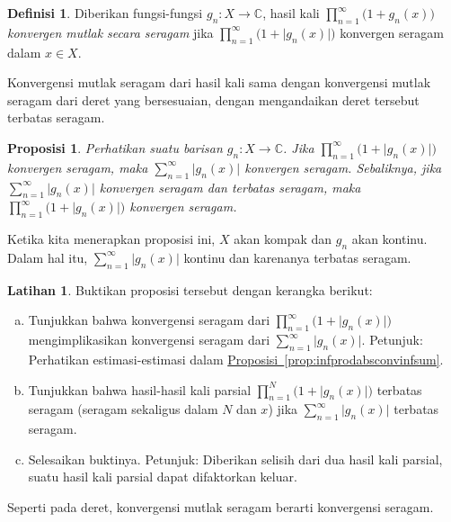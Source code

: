 \documentclass[12pt,openany]{book}
\newcommand{\sabs}[1]{\lvert {#1} \rvert}
\newcommand{\C}{{\mathbb{C}}}
\theoremstyle{plain}
\newtheorem{prop}[thm]{Proposisi}
\theoremstyle{remark}
\theoremstyle{definition}
\newtheorem{defn}[thm]{Definisi}
\newenvironment{exbox}{%
    \def\FrameCommand{\vrule width 1pt \relax\hspace{10pt}}%
    \MakeFramed{\advance\hsize-\width\FrameRestore}%
}{%
    \endMakeFramed
}
\newenvironment{exparts}{%
    \leavevmode\begin{enumerate}[a),noitemsep,topsep=0pt,parsep=0pt,partopsep=0pt]
}{%
    \end{enumerate}
}
\theoremstyle{exercise}
\newtheorem{exercise}{Latihan}[section]
\theoremstyle{example}
\newcommand{\propref}[1]{\hyperref[#1]{Proposisi~\ref*{#1}}}
\begin{document}
\begin{defn}
Diberikan fungsi-fungsi $g_n \colon X \to \C$, hasil kali
$\prod_{n=1}^{\infty} \bigl(1+g_n(x)\bigr)$ 
\emph{konvergen mutlak secara seragam}%
%
jika
$\prod_{n=1}^{\infty} \bigl(1+\sabs{g_n(x)}\bigr)$ 
konvergen seragam dalam $x \in X$.
\end{defn}

Konvergensi mutlak seragam dari hasil kali sama dengan konvergensi
mutlak seragam dari deret yang bersesuaian, dengan mengandaikan
deret tersebut terbatas seragam.

\begin{prop}
Perhatikan suatu barisan $g_n \colon X \to \C$.
Jika
$\prod_{n=1}^{\infty} \bigl(1+\sabs{g_n(x)}\bigr)$ 
konvergen seragam, maka
$\sum_{n=1}^{\infty} \sabs{g_n(x)}$ konvergen seragam.
Sebaliknya, jika
$\sum_{n=1}^{\infty} \sabs{g_n(x)}$ konvergen seragam
dan terbatas seragam, maka
$\prod_{n=1}^{\infty} \bigl(1+\sabs{g_n(x)}\bigr)$ 
konvergen seragam.
\end{prop}

Ketika kita menerapkan proposisi ini, $X$ akan kompak
dan $g_n$ akan kontinu.
Dalam hal itu, 
$\sum_{n=1}^{\infty} \sabs{g_n(x)}$ kontinu dan karenanya
terbatas seragam.

\begin{exbox}
\begin{exercise}
Buktikan proposisi tersebut dengan kerangka berikut:
\begin{exparts}
\item Tunjukkan bahwa konvergensi seragam dari
$\prod_{n=1}^{\infty} \bigl(1+\sabs{g_n(x)}\bigr)$
mengimplikasikan
konvergensi seragam dari
$\sum_{n=1}^{\infty} \sabs{g_n(x)}$.
Petunjuk:
Perhatikan estimasi-estimasi dalam \propref{prop:infprodabsconvinfsum}.
\item Tunjukkan bahwa
hasil-hasil kali parsial 
$\prod_{n=1}^{N} \bigl(1+\sabs{g_n(x)}\bigr)$
terbatas seragam (seragam sekaligus dalam $N$ dan $x$)
jika $\sum_{n=1}^{\infty} \sabs{g_n(x)}$ terbatas seragam.
\item Selesaikan buktinya.  Petunjuk: Diberikan selisih dari 
dua hasil kali parsial, suatu hasil kali parsial dapat difaktorkan keluar.
\end{exparts}
\end{exercise}
\end{exbox}

Seperti pada deret, konvergensi mutlak seragam berarti konvergensi
seragam.
\end{document}

